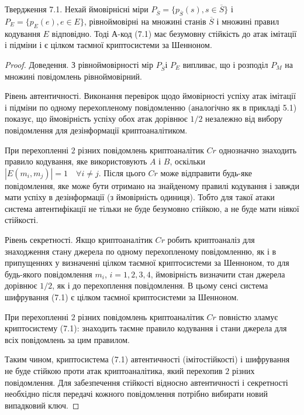 \begin{claim}
    Твердження 7.1. Нехай ймовірнісні міри $P_{\overline{S}} = \{p_{\overline{S}}(s), s \in \overline{S}\}$ і $P_{E} = \{p_{E}(e), e \in E\}$,
    рівноймовірні на множині станів $\overline{S}$ і множині правил кодування $E$
    відповідно. Тоді А-код (7.1) має безумовну стійкість до атак імітації і підміни і є
    цілком таємної криптосистеми за Шенноном.
\end{claim}
\begin{proof}
    Доведення. З рівноймовірності мір $P_{\overline{S}}$і $P_E$ випливає, що і розподіл $P_M$ на
    множині повідомлень рівноймовірний.
    
    Рівень автентичності. Виконання перевірок щодо ймовірності успіху атак
    імітації і підміни по одному перехопленому повідомленню (аналогічно як в
    прикладі 5.1) показує, що ймовірність успіху обох атак дорівнює $1/2$ незалежно
    від вибору повідомлення для дезінформації криптоаналітиком.
    
    При перехопленні $2$ різних повідомлень криптоаналітик $Cr$ однозначно
    знаходить правило кодування, яке використовують $A$ і $B$, оскільки
    $|E(m_i, m_j)| = 1 \quad \forall i \neq j$. Після цього $Cr$ може відправити будь-яке
    повідомлення, яке може бути отримано на знайденому правилі кодування і
    завжди мати успіху в дезінформації (з ймовірність одиниця). Тобто для такої
    атаки система автентифікації не тільки не буде безумовно стійкою, а не буде
    мати ніякої стійкості.
    
    Рівень секретності. Якщо криптоаналітик $Cr$ робить криптоаналіз для
    знаходження стану джерела по одному перехопленому повідомленню, як і в
    припущеннях у визначенні цілком таємної криптосистеми за Шенноном, то для
    будь-якого повідомлення $m_i$, $i = 1, 2, 3, 4$, ймовірність визначити стан джерела
    дорівнює $1/2$, як і до перехоплення повідомлення. В цьому сенсі система
    шифрування (7.1) є цілком таємної криптосистеми за Шенноном.
    
    При перехопленні $2$ різних повідомлень криптоаналітик $Cr$ повністю
    зламує криптосистему (7.1): знаходить таємне правило кодування і стани
    джерела для всіх повідомлень за цим правилом.
    
    Таким чином, криптосистема (7.1) автентичності (імітостійкості) і
    шифрування не буде стійкою проти атак криптоаналітика, який перехопив $2$
    різних повідомлення. Для забезпечення стійкості відносно автентичності і
    секретності необхідно після передачі кожного повідомлення потрібно вибирати
    новий випадковий ключ.
\end{proof}

